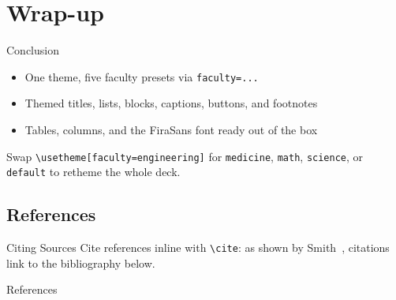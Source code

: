 \documentclass[aspectratio=169]{beamer}
\begin{document}
\section{Wrap-up}

\begin{frame}{Conclusion}
    \begin{itemize}
        \item One theme, five faculty presets via \texttt{faculty=...}
        \item Themed titles, lists, blocks, captions, buttons, and footnotes
        \item Tables, columns, and the FiraSans font ready out of the box
    \end{itemize}

    \vspace{0.6em}
    \begin{alertblock}{}
        Swap \texttt{\textbackslash usetheme[faculty=engineering]} for
        \texttt{medicine}, \texttt{math}, \texttt{science}, or
        \texttt{default} to retheme the whole deck.
    \end{alertblock}
\end{frame}

\subsection{References}

\begin{frame}{Citing Sources}
    Cite references inline with \texttt{\textbackslash cite}: as shown by
    Smith~\cite{r1}, citations link to the bibliography below.
\end{frame}

\appendix

\begin{frame}[allowframebreaks]{References}
    \footnotesize
    
    
\end{frame}
\end{document}
